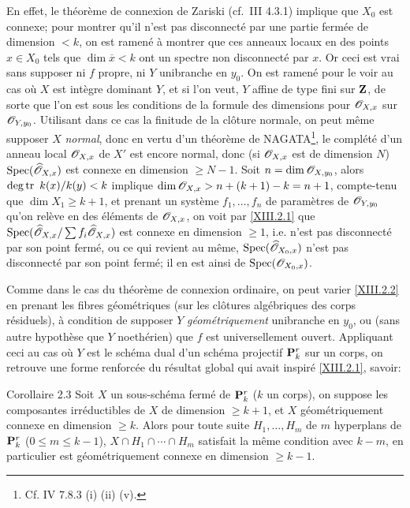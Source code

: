 En effet, le th\'eor\`eme de connexion de Zariski (cf.\ \EGA III 4.3.1) implique que $X_0$ est connexe; pour montrer qu'il n'est pas disconnect\'e par une partie ferm\'ee de dimension $<k$, on est ramen\'e \`a montrer que ces anneaux locaux en des points $x\in X_0$ tels que $\dim \overline{x}<k$ ont un spectre non disconnect\'e par $x$. Or ceci est vrai sans supposer ni $f$ propre, ni $Y$ unibranche en $y_0$. On est ramen\'e pour le voir au cas o\`u $X$ est int\`egre dominant $Y$, et si l'on veut, $Y$ affine de type fini sur $\mathbf{Z}$, de sorte que l'on est sous les conditions de la formule des dimensions pour ${\mathscr O}_{X, x}$ sur ${\mathscr O}_{Y, y_0}$. Utilisant dans ce cas la finitude de la cl\^{o}ture normale, on peut m\^eme supposer $X$ \emph{normal}, donc en vertu d'un th\'eor\`eme de NAGATA\footnote{Cf. \EGA IV 7.8.3 (i) (ii) (v).}, le compl\'et\'e d'un anneau local ${\mathscr O}_{X, x}$ de $X'$ est encore normal, donc (si ${\mathscr O}_{X, x}$ est de dimension $N$) $\operatorname{Spec} (\widehat{{\mathscr O}}_{X, x})$ est connexe en dimension $\ge N-1$. Soit $n=\dim{\mathscr O}_{X, y_0}$, alors $\operatorname{deg\,tr}~k(x)/k(y)<k$ implique $\dim {\mathscr O}_{X, x}>n+(k+1)-k=n+1$, compte-tenu que  $\dim X_1\ge k+1$, et prenant un syst\`eme $f_1, \dotsc, f_n$ de param\`etres de ${\mathscr O}_{Y, y_0}$ qu'on rel\`eve en des \'el\'ements de ${\mathscr O}_{X, x}$, on voit par \ref{XIII.2.1} que $\operatorname{Spec} (\widehat{{\mathscr O}}_{X, x}/\sum f_i\widehat{{\mathscr O}}_{X, x})$ est connexe en dimension $\ge 1$, i.e. n'est pas disconnect\'e par son point ferm\'e, ou ce qui revient au m\^eme, $\operatorname{Spec}(\widehat{{\mathscr O}}_{X_0, x})$ n'est pas disconnect\'e par son point ferm\'e; \afortiori il en est ainsi de $\operatorname{Spec} ({\mathscr O}_{X_0, x})$.

Comme dans le cas du th\'eor\`eme de connexion ordinaire, on peut varier \ref{XIII.2.2} en prenant les fibres g\'eom\'etriques (sur les cl\^{o}tures alg\'ebriques des corps r\'esiduels), \`a condition de supposer $Y$ \emph{géométriquement} unibranche en $y_0$, ou (sans autre hypoth\`ese que $Y$ noeth\'erien) que $f$ est universellement ouvert. Appliquant ceci au cas o\`u $Y$ est le sch\'ema dual d'un sch\'ema projectif ${\mathbf P}_k^r$ sur un corps, on retrouve une forme renforc\'ee du r\'esultat global qui avait inspir\'e \ref{XIII.2.1}, savoir:

\label{XIII.2.3}
\begin{enonce*}{Corollaire 2.3\ndemark}
Soit $X$ un sous-sch\'ema ferm\'e de ${\mathbf P}^r_k$ ($k$ un corps), on suppose les composantes irr\'eductibles de $X$ de dimension $\ge k+1$, et $X$ g\'eom\'etriquement connexe en dimension $\ge k$. Alors pour toute suite $H_1, \dotsc, H_m$ de $m$ hyperplans de ${\mathbf P}^r_k$ ($0\le m\le k-1$), $X\cap H_1\cap \dotsb \cap H_m$ satisfait la m\^eme condition avec $k-m$, en particulier est g\'eom\'etriquement connexe en dimension $\ge k-1$.
\end{enonce*}

